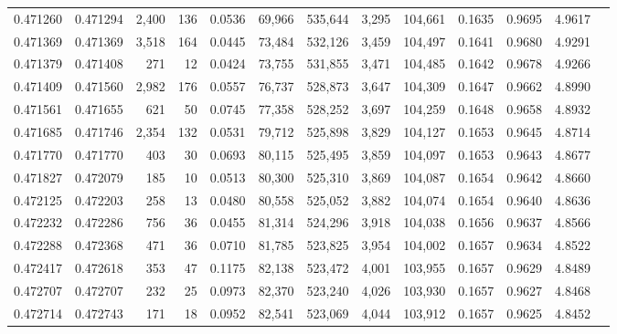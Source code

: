\begin{tabular}{rrrrrrrrrrrrr}
0.471260 & 0.471294 & 2,400 &   136 &                                     0.0536 &  69,966 & 535,644 &   3,295 & 104,661 & 0.1635 & 0.9695 & 4.9617 \\
0.471369 & 0.471369 & 3,518 &   164 &                                     0.0445 &  73,484 & 532,126 &   3,459 & 104,497 & 0.1641 & 0.9680 & 4.9291 \\
0.471379 & 0.471408 &   271 &    12 &                                     0.0424 &  73,755 & 531,855 &   3,471 & 104,485 & 0.1642 & 0.9678 & 4.9266 \\
0.471409 & 0.471560 & 2,982 &   176 &                                     0.0557 &  76,737 & 528,873 &   3,647 & 104,309 & 0.1647 & 0.9662 & 4.8990 \\
0.471561 & 0.471655 &   621 &    50 &                                     0.0745 &  77,358 & 528,252 &   3,697 & 104,259 & 0.1648 & 0.9658 & 4.8932 \\
0.471685 & 0.471746 & 2,354 &   132 &                                     0.0531 &  79,712 & 525,898 &   3,829 & 104,127 & 0.1653 & 0.9645 & 4.8714 \\
0.471770 & 0.471770 &   403 &    30 &                                     0.0693 &  80,115 & 525,495 &   3,859 & 104,097 & 0.1653 & 0.9643 & 4.8677 \\
0.471827 & 0.472079 &   185 &    10 &                                     0.0513 &  80,300 & 525,310 &   3,869 & 104,087 & 0.1654 & 0.9642 & 4.8660 \\
0.472125 & 0.472203 &   258 &    13 &                                     0.0480 &  80,558 & 525,052 &   3,882 & 104,074 & 0.1654 & 0.9640 & 4.8636 \\
0.472232 & 0.472286 &   756 &    36 &                                     0.0455 &  81,314 & 524,296 &   3,918 & 104,038 & 0.1656 & 0.9637 & 4.8566 \\
0.472288 & 0.472368 &   471 &    36 &                                     0.0710 &  81,785 & 523,825 &   3,954 & 104,002 & 0.1657 & 0.9634 & 4.8522 \\
0.472417 & 0.472618 &   353 &    47 &                                     0.1175 &  82,138 & 523,472 &   4,001 & 103,955 & 0.1657 & 0.9629 & 4.8489 \\
0.472707 & 0.472707 &   232 &    25 &                                     0.0973 &  82,370 & 523,240 &   4,026 & 103,930 & 0.1657 & 0.9627 & 4.8468 \\
0.472714 & 0.472743 &   171 &    18 &                                     0.0952 &  82,541 & 523,069 &   4,044 & 103,912 & 0.1657 & 0.9625 & 4.8452 \\

\end{tabular}

